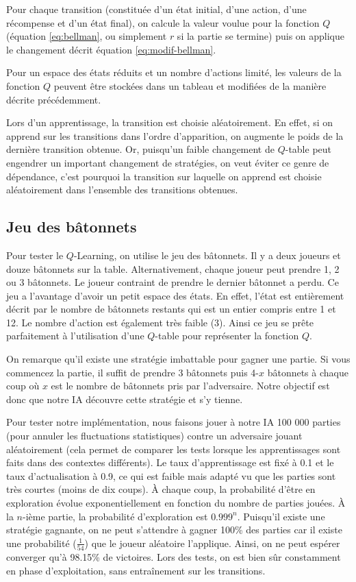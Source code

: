 Pour chaque transition (constituée d'un état initial, d'une action, d'une récompense et d'un état final), on calcule la valeur voulue pour la fonction $Q$ 
(équation \ref{eq:bellman}, ou simplement $r$ si la partie se termine) puis on applique le changement décrit équation \ref{eq:modif-bellman}.

Pour un espace des états réduits et un nombre d'actions limité, les valeurs de la fonction $Q$ peuvent être stockées dans un tableau et modifiées de la manière
décrite précédemment.

Lors d'un apprentissage, la transition est choisie aléatoirement. En effet, si on apprend sur les transitions dans l'ordre d'apparition, on augmente le poids de la
dernière transition obtenue. Or, puisqu'un faible changement de $Q$-table peut engendrer un important changement de stratégies, on veut éviter ce genre de dépendance,
c'est pourquoi la transition sur laquelle on apprend est choisie aléatoirement dans l'ensemble des transitions obtenues.


\subsection{Jeu des bâtonnets}

Pour tester le $Q$-Learning, on utilise le jeu des bâtonnets. Il y a deux joueurs et douze bâtonnets sur la table. Alternativement, chaque joueur peut prendre
1, 2 ou 3 bâtonnets. Le joueur contraint de prendre le dernier bâtonnet a perdu. Ce jeu a l'avantage d'avoir un petit espace des états. En effet, l'état est entièrement
décrit par le nombre de bâtonnets restants qui est un entier compris entre 1 et 12. Le nombre d'action est également très faible (3). Ainsi ce jeu se prête parfaitement à
l'utilisation d'une $Q$-table pour représenter la fonction $Q$.

On remarque qu'il existe une stratégie imbattable pour gagner une partie. Si vous commencez la partie, il suffit de prendre 3 bâtonnets puis 4-$x$ bâtonnets à chaque coup
où $x$ est le nombre de bâtonnets pris par l'adversaire. Notre objectif est donc que notre IA découvre cette stratégie et s'y tienne. 

Pour tester notre implémentation, nous faisons jouer à notre IA 100 000 parties (pour annuler les fluctuations statistiques) contre un adversaire jouant aléatoirement
(cela permet de comparer les tests lorsque les apprentissages sont faits dans des contextes différents). Le taux d'apprentissage est fixé à 0.1 et le taux d'actualisation
à 0.9, ce qui est faible mais adapté vu que les parties sont très courtes (moins de dix coups). À chaque coup, la probabilité d'être en exploration évolue 
exponentiellement en fonction du nombre de parties jouées. À la $n$-ième partie, la probabilité d'exploration est $0.999^n$. Puisqu'il existe une stratégie gagnante,
on ne peut s'attendre à gagner 100\% des parties car il existe une probabilité ($\frac{1}{54}$) que le joueur aléatoire l'applique. Ainsi, on ne peut espérer 
converger qu'à 98.15\% de victoires. Lors des tests, on est bien sûr constamment en phase d'exploitation, sans entraînement sur les transitions.

